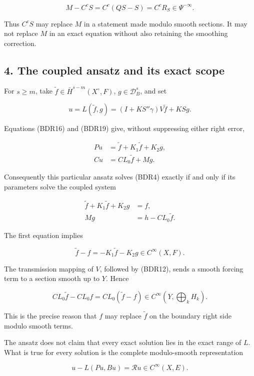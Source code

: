\documentclass[
  11pt,
]{article}
\begin{document}
\[
 M-C^cS=C^c(QS-S)=C^cR_S\in\Psi^{-\infty}.
 \tag{BDR24}
\]

Thus \(C^cS\) may replace \(M\) in a statement made modulo smooth
sections. It may not replace \(M\) in an exact equation without also
retaining the smoothing correction.

\subsection{4. The coupled ansatz and its exact
scope}\label{the-coupled-ansatz-and-its-exact-scope}

For \(s\geq m\), take \(\widetilde f\in\bar H^{s-m}(X^\circ,F)\),
\(g\in\mathcal D_B^s\), and set

\[
 u=L(\widetilde f,g)
   =(I+KS''\gamma)V\widetilde f+KSg.
 \tag{BDR25}
\]

Equations (BDR16) and (BDR19) give, without suppressing either right
error,

\[
 \begin{aligned}
 Pu&=\widetilde f+K_1\widetilde f+K_2g,\\
 Cu&=CL_0\widetilde f+Mg.
 \end{aligned}
 \tag{BDR26}
\]

Consequently this particular ansatz solves (BDR4) exactly if and only if
its parameters solve the coupled system

\[
 \boxed{
 \begin{aligned}
 \widetilde f+K_1\widetilde f+K_2g&=f,\\
 Mg&=h-CL_0\widetilde f.
 \end{aligned}}
 \tag{BDR27}
\]

The first equation implies

\[
 \widetilde f-f=-K_1\widetilde f-K_2g\in C^\infty(X,F).
 \tag{BDR28}
\]

The transmission mapping of \(V\), followed by (BDR12), sends a smooth
forcing term to a section smooth up to \(Y\). Hence

\[
 CL_0\widetilde f-CL_0f=CL_0(\widetilde f-f)\in C^\infty(Y,\textstyle\bigoplus_kH_k).
 \tag{BDR29}
\]

This is the precise reason that \(f\) may replace \(\widetilde f\) on
the boundary right side modulo smooth terms.

The ansatz does not claim that every exact solution lies in the exact
range of \(L\). What is true for every solution is the complete
modulo-smooth representation

\[
 u-L(Pu,Bu)=\mathcal Ru\in C^\infty(X,E).
 \tag{BDR30}
\]
\end{document}
